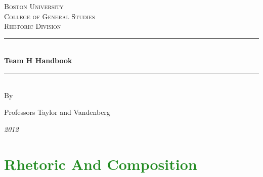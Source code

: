 \documentclass[12pt, hidelinks]{article} %
\begin{document}

\begin{titlepage}

\newcommand{\HRule}{\rule{\linewidth}{0.3mm}} %

\center %

\textsc{\LARGE Boston University}\\[1.5cm] %
\textsc{\Large College of General Studies}\\[0.5cm] %
\textsc{\large Rhetoric Division}\\[0.5cm] %

\HRule \\[0.4cm]
{ \huge \bfseries Team H Handbook}\\[0.4cm] %
\HRule \\[1.5cm]

By

Professors Taylor and Vandenberg



\vfill %
\emph{2012}\\[.5cm] 
\end{titlepage}


\tableofcontents %

\newpage %




\section{\textcolor{ForestGreen}{Rhetoric And Composition}}
\end{document}
